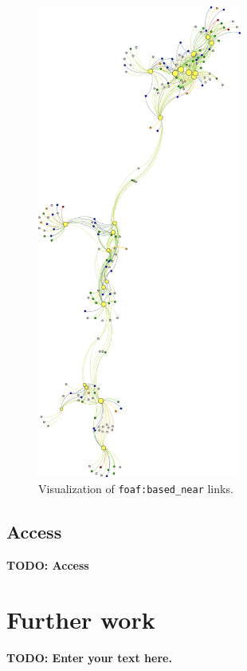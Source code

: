 \documentclass[draft,final]{vutinfth} %
\newcommand{\todo}[1]{{\color{red}\textbf{TODO: {#1}}}} %
\begin{document}
\begin{figure}[h]
    \centering
    \includegraphics[width=0.6\textwidth]{graphics/evaluation/buildingsNearByLinking.png}
    \caption{Visualization of \texttt{foaf:based\_near} links.}
    \label{fig:dicussion-chapter-evaluation:linking}
\end{figure}

\subsection{Access}
\label{dicussion-chapter-evaluation:access}
\todo{Access}

\section{Further work}
\label{dicussion-chapter-future-work}
\todo{Enter your text here.}
\end{document}
